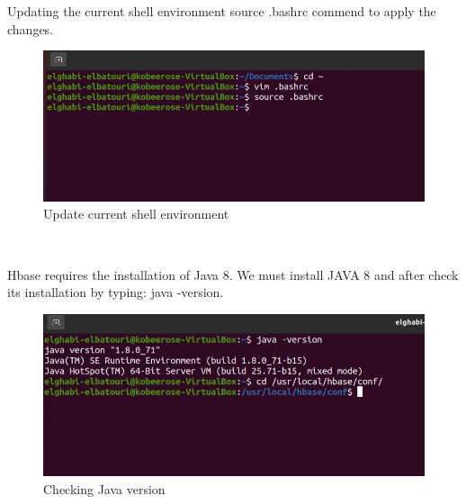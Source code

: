 \begin{spacing}{1.2}
\par Updating the current shell environment source .bashrc commend to apply the changes.
\\
\begin{figure}[!htb] 
\begin{center} 
\includegraphics[width=1\linewidth]{Pictures/HBase/Configuring Hbase in Standalone & Pseudo-distributed mode/Installing and Configuring Apache Hbase/Update current shell environment} 
\end{center} 
\caption{Update current shell environment} 
\end{figure}  \FloatBarrier
\\
\newpage
\par Hbase requires the installation of Java 8. We must install JAVA 8 and after check its installation by typing: java -version.
\\
\begin{figure}[!htb] 
\begin{center} 
\includegraphics[width=1\linewidth]{Pictures/HBase/Configuring Hbase in Standalone & Pseudo-distributed mode/Installing and Configuring Apache Hbase/Checking Java version} 
\end{center} 
\caption{Checking Java version} 
\end{figure}  \FloatBarrier
\\


\end{spacing}
